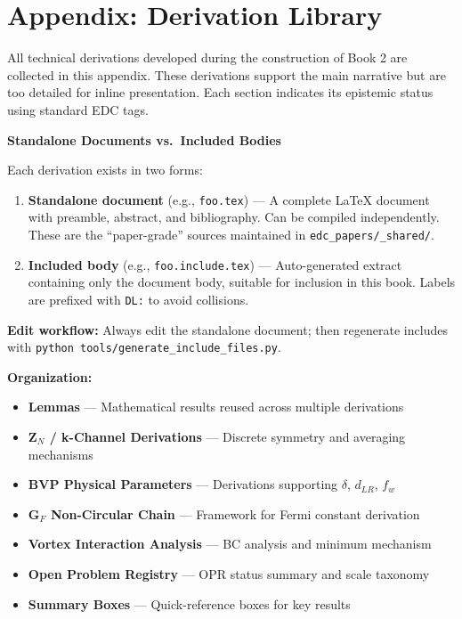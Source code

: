 
\chapter*{Appendix: Derivation Library}

All technical derivations developed during the construction of Book 2 are collected
in this appendix. These derivations support the main narrative but are too detailed
for inline presentation. Each section indicates its epistemic status using standard
EDC tags.

\begin{tcolorbox}[colback=blue!5!white, colframe=blue!50!black, title={Provenance Note}]
\textbf{Standalone Documents vs.\ Included Bodies}

Each derivation exists in two forms:
\begin{enumerate}
    \item \textbf{Standalone document} (e.g., \texttt{foo.tex}) --- A complete LaTeX
        document with preamble, abstract, and bibliography. Can be compiled independently.
        These are the ``paper-grade'' sources maintained in \texttt{edc\_papers/\_shared/}.
    \item \textbf{Included body} (e.g., \texttt{foo.include.tex}) --- Auto-generated
        extract containing only the document body, suitable for inclusion in this book.
        Labels are prefixed with \texttt{DL:} to avoid collisions.
\end{enumerate}

\textbf{Edit workflow:} Always edit the standalone document; then regenerate includes
with \texttt{python tools/generate\_include\_files.py}.
\end{tcolorbox}

\textbf{Organization:}
\begin{itemize}
    \item \textbf{Lemmas} --- Mathematical results reused across multiple derivations
    \item \textbf{Z$_N$ / k-Channel Derivations} --- Discrete symmetry and averaging mechanisms
    \item \textbf{BVP Physical Parameters} --- Derivations supporting $\delta$, $d_{LR}$, $f_w$
    \item \textbf{G$_F$ Non-Circular Chain} --- Framework for Fermi constant derivation
    \item \textbf{Vortex Interaction Analysis} --- BC analysis and minimum mechanism
    \item \textbf{Open Problem Registry} --- OPR status summary and scale taxonomy
    \item \textbf{Summary Boxes} --- Quick-reference boxes for key results
\end{itemize}


